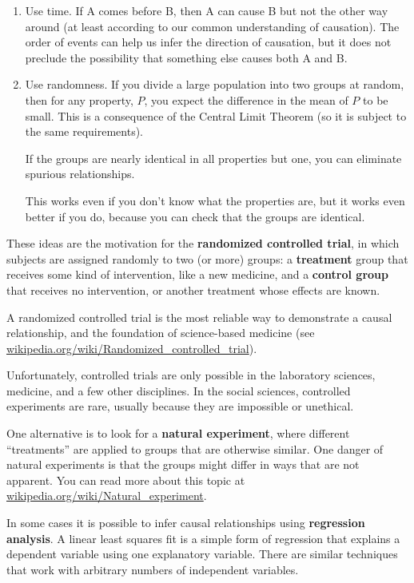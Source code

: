 \documentclass[12pt]{book}
\begin{document}
\begin{enumerate}

\item Use time.  If A comes before B, then A can cause B but not the
  other way around (at least according to our common understanding of
  causation).  The order of events can help us infer the direction
  of causation, but it does not preclude the possibility that something
  else causes both A and B.

\item Use randomness.  If you divide a large population into two
  groups at random, then for any property, $P$, you expect the
  difference in the mean of $P$ to be small.  This is a consequence
  of the Central Limit Theorem (so it is subject to the same
  requirements).

  If the groups are nearly identical in all properties but one, you
  can eliminate spurious relationships.

  This works even if you don't know what the properties
  are, but it works even better if you do, because you can check that
  the groups are identical.

\end{enumerate}

These ideas are the motivation for the {\bf randomized controlled
trial}, in which subjects are assigned randomly to two (or more)
groups: a {\bf treatment} group that receives some kind of intervention,
like a new medicine, and a {\bf control group} that receives
no intervention, or another treatment whose effects are known.

A randomized controlled trial is the most reliable way to demonstrate
a causal relationship, and the foundation of science-based medicine
(see \url{wikipedia.org/wiki/Randomized_controlled_trial}).

Unfortunately, controlled trials are only possible in the laboratory
sciences, medicine, and a few other disciplines.  In the social sciences,
controlled experiments are rare, usually because they are impossible
or unethical.

One alternative is to look for a {\bf natural experiment}, where
different ``treatments'' are applied to groups that are otherwise
similar.  One danger of natural experiments is that the groups might
differ in ways that are not apparent.  You can read more about this
topic at \url{wikipedia.org/wiki/Natural_experiment}.

In some cases it is possible to infer causal relationships using {\bf
  regression analysis}.  A linear least squares fit
is a simple form of regression that explains a dependent
variable using one explanatory variable.  There are similar
techniques that work with arbitrary numbers of independent variables.
\end{document}
